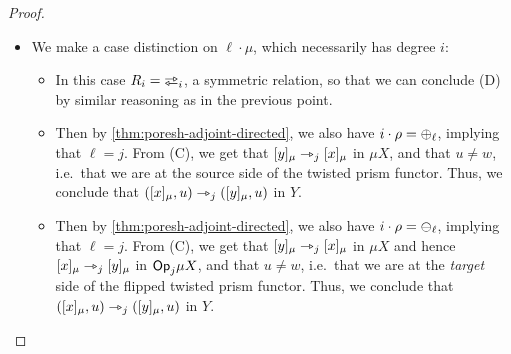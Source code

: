 \documentclass[a4paper]{memoir}
\begin{document}
\begin{proof}
\begin{enumerate}
\begin{itemize}
\begin{itemize}
\begin{description}
\begin{itemize}
						\item[\framebox{$a_i = \ypolar$}] We make a case distinction on $\ell \cdot \mu$, which necessarily has degree $i$:
						\begin{itemize}
							\item[\framebox{$\ell \cdot \mu = \isopol_i\pmrhom{\ypolar}{b_\ell}$}]
							In this case $R_i = \infrajetsym_i$, a symmetric relation, so that we can conclude (D) by similar reasoning as in the previous point.
							
							\item[\framebox{$\ell \cdot \mu = \pospol_i\pmryy$}]
							Then by \cref{thm:poresh-adjoint-directed}, we also have $i \cdot \rho = {\oplus}_\ell$, implying that $\ell = j$.
							From (C), we get that $[y]_\mu \rightarrowtriangle_j [x]_\mu$ in $\mu X$, and that $u \neq w$, i.e.\ that we are at the source side of the twisted prism functor.
							Thus, we conclude that $([x]_\mu, u) \rightarrowtriangle_j ([y]_\mu, u)$ in $Y$.
							
							\item[\framebox{$\ell \cdot \mu = \negpol_i\pmryy$}]
							Then by \cref{thm:poresh-adjoint-directed}, we also have $i \cdot \rho = {\ominus}_\ell$, implying that $\ell = j$.
							From (C), we get that $[y]_\mu \rightarrowtriangle_j [x]_\mu$ in $\mu X$ and hence $[x]_\mu \rightarrowtriangle_j [y]_\mu$ in ${\mathsf{Op}}_j \mu X$, and that $u \neq w$, i.e.\ that we are at the \emph{target} side of the flipped twisted prism functor.
							Thus, we conclude that $([x]_\mu, u) \rightarrowtriangle_j ([y]_\mu, u)$ in $Y$.
						\end{itemize}
					\end{itemize}
				\end{description}
			\end{itemize}
			

\end{itemize}
\end{enumerate}
\end{proof}
\end{document}
